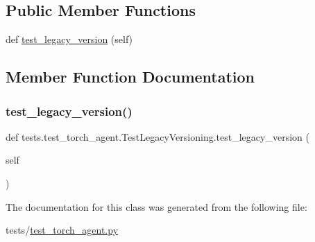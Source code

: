 \subsection*{Public Member Functions}
\begin{DoxyCompactItemize}
\item 
def \hyperlink{classtests_1_1test__torch__agent_1_1TestLegacyVersioning_ab1faa8a34d7089006cfa5746b0ada62f}{test\+\_\+legacy\+\_\+version} (self)
\end{DoxyCompactItemize}


\subsection{Member Function Documentation}
\mbox{\label{classtests_1_1test__torch__agent_1_1TestLegacyVersioning_ab1faa8a34d7089006cfa5746b0ada62f}} 
\subsubsection{\texorpdfstring{test\+\_\+legacy\+\_\+version()}{test\_legacy\_version()}}
{\footnotesize\ttfamily def tests.\+test\+\_\+torch\+\_\+agent.\+Test\+Legacy\+Versioning.\+test\+\_\+legacy\+\_\+version (\begin{DoxyParamCaption}\item[{}]{self }\end{DoxyParamCaption})}



The documentation for this class was generated from the following file\+:\begin{DoxyCompactItemize}
\item 
tests/\hyperlink{test__torch__agent_8py}{test\+\_\+torch\+\_\+agent.\+py}\end{DoxyCompactItemize}
